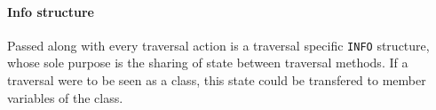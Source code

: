 \documentclass[twoside,openright]{uva-bachelor-thesis}
\newcommand{\code}[1]{\texttt{\footnotesize#1}}
\begin{document}
		\paragraph{Info structure}
			Passed along with every traversal action is a traversal specific \code{INFO} structure, whose sole purpose is the sharing of state between traversal methods. If a traversal were to be seen as a class, this state could be transfered to member variables of the class.
	

\end{document}
